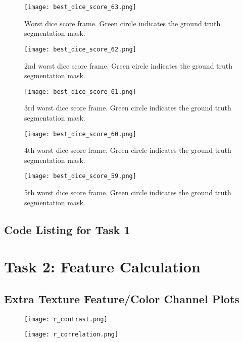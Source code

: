 \documentclass{report}
\begin{document}
\begin{appendices}
\begin{figure}
    \centering
    \texttt{[image: best\_dice\_score\_63.png]}
    \caption{Worst dice score frame. Green circle indicates the ground truth segmentation mask.}
\end{figure}
\begin{figure}
    \centering
    \texttt{[image: best\_dice\_score\_62.png]}
    \caption{2nd worst dice score frame. Green circle indicates the ground truth segmentation mask.}
\end{figure}
\begin{figure}
    \centering
    \texttt{[image: best\_dice\_score\_61.png]}
    \caption{3rd worst dice score frame. Green circle indicates the ground truth segmentation mask.}
\end{figure}
\begin{figure}
    \centering
    \texttt{[image: best\_dice\_score\_60.png]}
    \caption{4th worst dice score frame. Green circle indicates the ground truth segmentation mask.}
\end{figure}
\begin{figure}
    \centering
    \texttt{[image: best\_dice\_score\_59.png]}
    \caption{5th worst dice score frame. Green circle indicates the ground truth segmentation mask.}
\end{figure}

\pagebreak

\section{Code Listing for Task 1}



\chapter{Task 2: Feature Calculation}\label{sec:app_task_2}

\section{Extra Texture Feature/Color Channel Plots}

\begin{figure}
    \texttt{[image: r\_contrast.png]}
\end{figure}

\begin{figure}
    \texttt{[image: r\_correlation.png]}
\end{figure}


\end{appendices}
\end{document}
